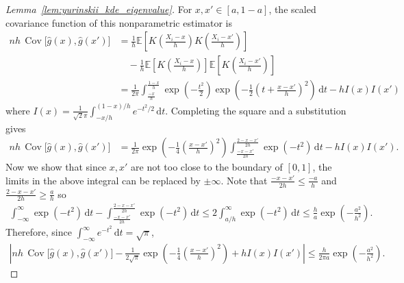 \documentclass[11pt,lof]{puthesis}
\newcommand{\E}{\ensuremath{\mathbb{E}}}
\DeclareMathOperator{\Cov}{Cov}
\newcommand{\diff}[1]{\,\mathrm{d}#1}
\theoremstyle{break}
\theoremstyle{proof}
\newtheorem{proof}{Proof}
\begin{document}
\begin{proof}[Lemma~\ref{lem:yurinskii_kde_eigenvalue}]

  For $x, x' \in [a, 1-a]$, the scaled covariance function
  of this nonparametric estimator is
  \begin{align*}
    n h\, \Cov\big[\hat g(x), \hat g(x')\big]
    &=
    \frac{1}{h}
    \E \left[
      K \left( \frac{X_i - x}{h} \right)
      K \left( \frac{X_i - x'}{h} \right)
    \right] \\
    &\quad-
    \frac{1}{h}
    \E \left[
      K \left( \frac{X_i - x}{h} \right)
    \right]
    \E \left[
      K \left( \frac{X_i - x'}{h} \right)
    \right] \\
    &=
    \frac{1}{2 \pi}
    \int_{\frac{-x}{h}}^{\frac{1-x}{h}}
    \exp \left( - \frac{t^2}{2} \right)
    \exp \left( - \frac{1}{2} \left( t + \frac{x - x'}{h} \right)^2 \right)
    \diff t
    - h I(x) I(x')
  \end{align*}
  where
  $I(x) = \frac{1}{\sqrt 2 \pi} \int_{-x/h}^{(1-x)/h} e^{-t^2/2} \diff t$.
  Completing the square and a substitution gives
  \begin{align*}
    n h\, \Cov\big[\hat g(x), \hat g(x')\big]
    &=
    \frac{1}{2 \pi}
    \exp \left( - \frac{1}{4} \left( \frac{x-x'}{h} \right)^2 \right)
    \int_{\frac{-x-x'}{2h}}^{\frac{2-x-x'}{2h}}
    \exp \left(-t^2\right)
    \diff t
    - h I(x) I(x').
  \end{align*}
  Now we show that since $x, x'$ are not too close to the boundary
  of $[0,1]$,
  the limits in the above integral can be replaced by $\pm \infty$.
  Note that $\frac{-x-x'}{2h} \leq \frac{-a}{h}$
  and $\frac{2-x-x'}{2h} \geq \frac{a}{h}$ so
  \begin{align*}
    \int_{-\infty}^{\infty}
    \exp \left(-t^2\right)
    \diff t
    - \int_{\frac{-x-x'}{2h}}^{\frac{2-x-x'}{2h}}
    \exp \left(-t^2\right)
    \diff t
    \leq
    2 \int_{a/h}^\infty
    \exp \left(-t^2\right)
    \diff t
    \leq
    \frac{h}{a}
    \exp \left(- \frac{a^2}{h^2}\right).
  \end{align*}
  Therefore, since
  $\int_{-\infty}^{\infty} e^{-t^2} \diff t = \sqrt \pi$,
  \begin{align*}
    \left|
      n h\, \Cov\big[\hat g(x), \hat g(x')\big]
      - \frac{1}{2 \sqrt \pi}
      \exp \left( - \frac{1}{4} \left( \frac{x-x'}{h} \right)^2 \right)
      + h I(x) I(x')
    \right|
    \leq
    \frac{h}{2 \pi a}
    \exp \left(- \frac{a^2}{h^2}\right).
  \end{align*}

\end{proof}
\end{document}
